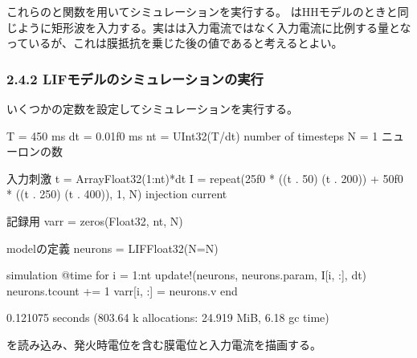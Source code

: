 \documentclass[letterpaper,10pt,english]{sphinxmanual}
\begin{document}
これらのと関数を用いてシミュレーションを実行する。 はHHモデルのときと同じように矩形波を入力する。実はは入力電流ではなく入力電流に比例する量となっているが、これは膜抵抗を乗じた後の値であると考えるとよい。


\subsubsection{2.4.2 LIFモデルのシミュレーションの実行}
\label{\detokenize{2-4_lif:id7}}
いくつかの定数を設定してシミュレーションを実行する。

\begin{sphinxVerbatim}[commandchars=\\\{\}]
T = 450 \PYGZsh{} ms
dt = 0.01f0 \PYGZsh{} ms
nt = UInt32(T/dt) \PYGZsh{} number of timesteps
N = 1 \PYGZsh{} ニューロンの数

\PYGZsh{} 入力刺激
t = Array\PYGZob{}Float32\PYGZcb{}(1:nt)*dt
I = repeat(25f0 * ((t .\PYGZgt{} 50) \PYGZhy{} (t .\PYGZgt{} 200)) + 50f0 * ((t .\PYGZgt{} 250) \PYGZhy{} (t .\PYGZgt{} 400)), 1, N)  \PYGZsh{} injection current

\PYGZsh{} 記録用
varr = zeros(Float32, nt, N)

\PYGZsh{} modelの定義
neurons = LIF\PYGZob{}Float32\PYGZcb{}(N=N)

\PYGZsh{} simulation
@time for i = 1:nt
    update!(neurons, neurons.param, I[i, :], dt)
    neurons.tcount += 1
    varr[i, :] = neurons.v\PYGZus{}
end
\end{sphinxVerbatim}

\begin{sphinxVerbatim}[commandchars=\\\{\}]
  0.121075 seconds (803.64 k allocations: 24.919 MiB, 6.18\PYGZpc{} gc time)
\end{sphinxVerbatim}

を読み込み、発火時電位を含む膜電位と入力電流を描画する。

\begin{sphinxVerbatim}[commandchars=\\\{\}]
 
\end{sphinxVerbatim}
\end{document}
